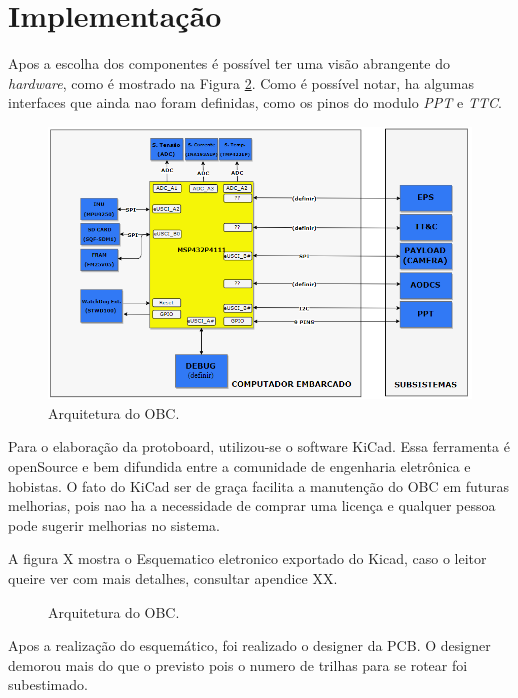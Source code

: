 \newpage
\section{Implementação}

Apos a escolha dos componentes é possível ter uma visão abrangente do \textit{hardware}, como é mostrado na Figura \ref{arquiteturaOBC}. Como é possível notar, ha algumas interfaces que ainda nao foram definidas, como os pinos do modulo \textit{PPT} e \textit{TTC}.

\begin{figure}[h]
	\centering
	\includegraphics[keepaspectratio=true,scale=0.78]{figuras/arquiteturaHard2.PNG}
	\caption{Arquitetura do OBC.}
	\label{arquiteturaOBC}
\end{figure}

\newpage
Para o elaboração da protoboard, utilizou-se o software KiCad. Essa ferramenta é openSource e bem difundida entre a comunidade de engenharia eletrônica e hobistas. O fato do KiCad ser de graça facilita a manutenção do OBC em futuras melhorias, pois nao ha a necessidade de comprar uma licença e qualquer pessoa pode sugerir melhorias no sistema.

A figura X mostra o Esquematico eletronico exportado do Kicad, caso o leitor queire ver com mais detalhes, consultar apendice XX.

\begin{figure}[h]
	\centering
	
	\caption{Arquitetura do OBC.}
	\label{arquiteturaOBC}
\end{figure}

\newpage

Apos a realização do esquemático, foi realizado o designer da PCB. O designer demorou mais do que o previsto pois o numero de trilhas para se rotear foi subestimado. 

